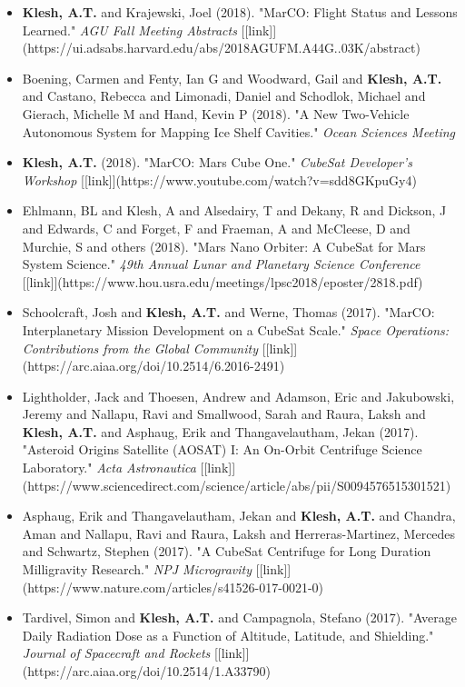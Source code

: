\documentclass[11pt,letterpaper]{article}
\begin{document}
\begin{itemize}
\item \textbf{Klesh, A.T.} and Krajewski, Joel (2018). "MarCO: Flight Status and Lessons Learned." \textit{AGU Fall Meeting Abstracts} [[link]](https://ui.adsabs.harvard.edu/abs/2018AGUFM.A44G..03K/abstract)
\item Boening, Carmen and Fenty, Ian G and Woodward, Gail and \textbf{Klesh, A.T.} and Castano, Rebecca and Limonadi, Daniel and Schodlok, Michael and Gierach, Michelle M and Hand, Kevin P (2018). "A New Two-Vehicle Autonomous System for Mapping Ice Shelf Cavities." \textit{Ocean Sciences Meeting}
\item \textbf{Klesh, A.T.} (2018). "MarCO: Mars Cube One." \textit{CubeSat Developer's Workshop} [[link]](https://www.youtube.com/watch?v=sdd8GKpuGy4)
\item Ehlmann, BL and Klesh, A and Alsedairy, T and Dekany, R and Dickson, J and Edwards, C and Forget, F and Fraeman, A and McCleese, D and Murchie, S and others (2018). "Mars Nano Orbiter: A CubeSat for Mars System Science." \textit{49th Annual Lunar and Planetary Science Conference} [[link]](https://www.hou.usra.edu/meetings/lpsc2018/eposter/2818.pdf)
\item Schoolcraft, Josh and \textbf{Klesh, A.T.} and Werne, Thomas (2017). "MarCO: Interplanetary Mission Development on a CubeSat Scale." \textit{Space Operations: Contributions from the Global Community} [[link]](https://arc.aiaa.org/doi/10.2514/6.2016-2491)
\item Lightholder, Jack and Thoesen, Andrew and Adamson, Eric and Jakubowski, Jeremy and Nallapu, Ravi and Smallwood, Sarah and Raura, Laksh and \textbf{Klesh, A.T.} and Asphaug, Erik and Thangavelautham, Jekan (2017). "Asteroid Origins Satellite (AOSAT) I: An On-Orbit Centrifuge Science Laboratory." \textit{Acta Astronautica} [[link]](https://www.sciencedirect.com/science/article/abs/pii/S0094576515301521)
\item Asphaug, Erik and Thangavelautham, Jekan and \textbf{Klesh, A.T.} and Chandra, Aman and Nallapu, Ravi and Raura, Laksh and Herreras-Martinez, Mercedes and Schwartz, Stephen (2017). "A CubeSat Centrifuge for Long Duration Milligravity Research." \textit{NPJ Microgravity} [[link]](https://www.nature.com/articles/s41526-017-0021-0)
\item Tardivel, Simon and \textbf{Klesh, A.T.} and Campagnola, Stefano (2017). "Average Daily Radiation Dose as a Function of Altitude, Latitude, and Shielding." \textit{Journal of Spacecraft and Rockets} [[link]](https://arc.aiaa.org/doi/10.2514/1.A33790)

\end{itemize}
\end{document}
